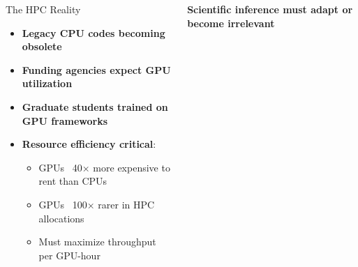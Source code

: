 \documentclass[aspectratio=169]{beamer}
\begin{document}
\begin{frame}
\begin{columns}
\begin{block}{The HPC Reality}
\begin{itemize}
                \item \textbf{Legacy CPU codes becoming obsolete}
                \item \textbf{Funding agencies expect GPU utilization}
                \item \textbf{Graduate students trained on GPU frameworks}
                \item \textbf{Resource efficiency critical}:
                    \begin{itemize}
                        \item GPUs ~40× more expensive to rent than CPUs
                        \item GPUs ~100× rarer in HPC allocations
                        \item Must maximize throughput per GPU-hour
                    \end{itemize}
            \end{itemize}
        \end{block}
        \vspace{10pt}
        \begin{center}
            \textbf{Scientific inference must adapt or become irrelevant}
        \end{center}
    \end{columns}
\end{frame}
\end{document}
